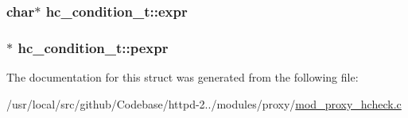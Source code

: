 \subsubsection[{\texorpdfstring{expr}{expr}}]{\setlength{\rightskip}{0pt plus 5cm}char$\ast$ hc\+\_\+condition\+\_\+t\+::expr}\hypertarget{structhc__condition__t_a865911c21fd3c03f128c589f97f1894f}{}\label{structhc__condition__t_a865911c21fd3c03f128c589f97f1894f}
\subsubsection[{\texorpdfstring{pexpr}{pexpr}}]{$\ast$ hc\+\_\+condition\+\_\+t\+::pexpr}\hypertarget{structhc__condition__t_a56a401abc8e84152d842cb8a37d37e7d}{}\label{structhc__condition__t_a56a401abc8e84152d842cb8a37d37e7d}


The documentation for this struct was generated from the following file\+:\begin{DoxyCompactItemize}
\item 
/usr/local/src/github/\+Codebase/httpd-\/2../modules/proxy/\hyperlink{mod__proxy__hcheck_8c}{mod\+\_\+proxy\+\_\+hcheck.\+c}\end{DoxyCompactItemize}
